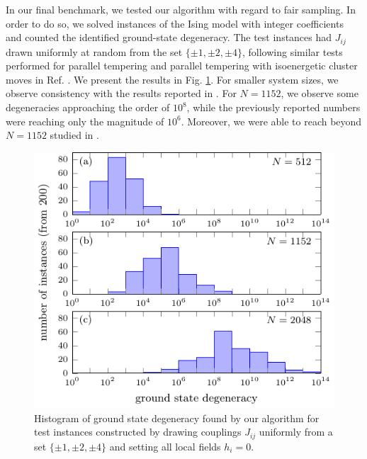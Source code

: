 In our final benchmark, we tested our algorithm with regard to fair sampling.
In order to do so, we solved instances of the Ising model with integer
coefficients and counted the identified ground-state degeneracy. The test
instances had $J_{ij}$ drawn uniformly at random from the set $\{\pm 1, \pm 2,
    \pm 4\}$, following similar tests performed for parallel tempering and parallel
tempering with isoenergetic cluster moves \cite{Zhu_PT+ICM_2015} in Ref.
\cite{zhu_fair_2019}. We present the results in Fig.
\ref{fig:ground-degeneracy}. For smaller system sizes, we observe consistency
with the results reported in \cite{zhu_fair_2019}. For $N=1152$, we observe
some degeneracies approaching the order of $10^{8}$, while the previously
reported numbers were reaching only the magnitude of $10^{6}$. Moreover, we
were able to reach beyond $N=1152$ studied in \cite{zhu_fair_2019}.

\begin{figure}
  \includegraphics[width=\textwidth]{figures/tn-ground-degeneracy.pdf}
  \caption{Histogram of ground state degeneracy found by our algorithm for test instances
    constructed by drawing couplings $J_{ij}$ uniformly from a set $\{\pm 1, \pm 2,
        \pm 4\}$ and setting all local fields $h_{i} = 0$.}
  \label{fig:ground-degeneracy}
\end{figure}
